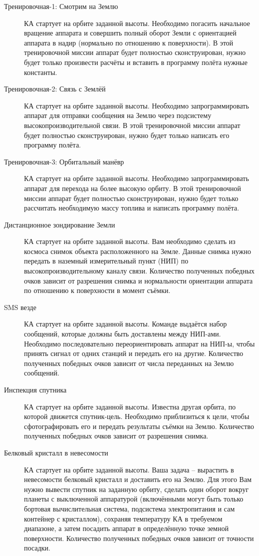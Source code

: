 \documentclass[12pt,a4paper]{article}
\begin{document}
\begin{description}
  \item[Тренировочная-1: Смотрим на Землю] КА стартует на орбите заданной
    высоты. Необходимо погасить начальное вращение аппарата и совершить полный оборот
    Земли с ориентацией аппарата в надир (нормально по отношению к поверхности). В этой
    тренировочной миссии аппарат будет полностью сконструирован, нужно будет только
    произвести расчёты и вставить в программу полёта нужные константы.
  \item[Тренировочная-2: Связь с Землёй] КА стартует на орбите заданной
    высоты. Необходимо запрограммировать аппарат для отправки сообщения на Землю через
    подсистему высокопроизводительной связи. В этой тренировочной миссии аппарат будет
    полностью сконструирован, нужно будет только написать его программу полёта.
  \item[Тренировочная-3: Орбитальный манёвр] КА стартует на орбите заданной
    высоты. Необходимо запрограммировать аппарат для перехода на более высокую орбиту. В
    этой тренировочной миссии аппарат будет полностью сконструирован, нужно будет только
    рассчитать необходимую массу топлива и написать программу полёта.
  \item[Дистанционное зондирование Земли] КА стартует на орбите заданной высоты. Вам
    необходимо сделать из космоса снимок объекта расположенного на Земле. Данные снимка
    нужно передать в наземный измерительный пункт (НИП) по высокопроизводительному каналу
    связи. Количество полученных победных очков зависит от разрешения снимка и
    нормальности ориентации аппарата по отношению к поверхности в момент съёмки.
  \item[SMS везде] КА стартует на орбите заданной высоты. Команде выдаётся набор
    сообщений, которые должны быть доставлены между НИП-ами. Необходимо последовательно
    переориентировать аппарат на НИП-ы, чтобы принять сигнал от одних станций и передать
    его на другие. Количество полученных победных очков зависит от числа переданных на
    Землю сообщений.
  \item[Инспекция спутника] КА стартует на орбите заданной высоты. Известна другая орбита,
    по которой движется спутник-цель. Необходимо приблизиться к цели, чтобы
    сфотографировать его и передать результаты съёмки на Землю. Количество полученных
    победных очков зависит от разрешения снимка.
  \item[Белковый кристалл в невесомости] КА стартует на орбите заданной высоты. Ваша
    задача – вырастить в невесомости белковый кристалл и доставить его на Землю. Для этого
    Вам нужно вывести спутник на заданную орбиту, сделать один оборот вокруг планеты с
    выключенной аппаратурой (включёнными могут быть только бортовая вычислительная
    система, подсистема электропитания и сам контейнер с кристаллом), сохраняя температуру
    КА в требуемом диапазоне, а затем посадить аппарат в определённую точке земной
    поверхности. Количество полученных победных очков зависит от точности посадки.
\end{description}
\end{document}
